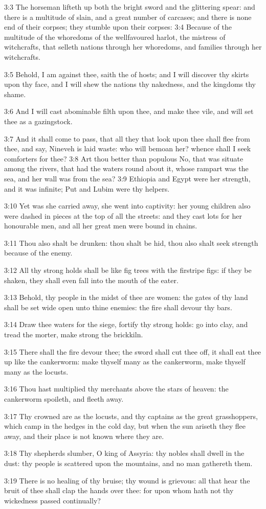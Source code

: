3:3 The horseman lifteth up both the bright sword and the glittering spear: and there is a multitude of slain, and a great number of carcases; and there is none end of their corpses; they stumble upon their corpses: 3:4 Because of the multitude of the whoredoms of the wellfavoured harlot, the mistress of witchcrafts, that selleth nations through her whoredoms, and families through her witchcrafts.

3:5 Behold, I am against thee, saith the \LORD of hosts; and I will discover thy skirts upon thy face, and I will shew the nations thy nakedness, and the kingdoms thy shame.

3:6 And I will cast abominable filth upon thee, and make thee vile, and will set thee as a gazingstock.

3:7 And it shall come to pass, that all they that look upon thee shall flee from thee, and say, Nineveh is laid waste: who will bemoan her?  whence shall I seek comforters for thee?  3:8 Art thou better than populous No, that was situate among the rivers, that had the waters round about it, whose rampart was the sea, and her wall was from the sea?  3:9 Ethiopia and Egypt were her strength, and it was infinite; Put and Lubim were thy helpers.

3:10 Yet was she carried away, she went into captivity: her young children also were dashed in pieces at the top of all the streets: and they cast lots for her honourable men, and all her great men were bound in chains.

3:11 Thou also shalt be drunken: thou shalt be hid, thou also shalt seek strength because of the enemy.

3:12 All thy strong holds shall be like fig trees with the firstripe figs: if they be shaken, they shall even fall into the mouth of the eater.

3:13 Behold, thy people in the midst of thee are women: the gates of thy land shall be set wide open unto thine enemies: the fire shall devour thy bars.

3:14 Draw thee waters for the siege, fortify thy strong holds: go into clay, and tread the morter, make strong the brickkiln.

3:15 There shall the fire devour thee; the sword shall cut thee off, it shall eat thee up like the cankerworm: make thyself many as the cankerworm, make thyself many as the locusts.

3:16 Thou hast multiplied thy merchants above the stars of heaven: the cankerworm spoileth, and fleeth away.

3:17 Thy crowned are as the locusts, and thy captains as the great grasshoppers, which camp in the hedges in the cold day, but when the sun ariseth they flee away, and their place is not known where they are.

3:18 Thy shepherds slumber, O king of Assyria: thy nobles shall dwell in the dust: thy people is scattered upon the mountains, and no man gathereth them.

3:19 There is no healing of thy bruise; thy wound is grievous: all that hear the bruit of thee shall clap the hands over thee: for upon whom hath not thy wickedness passed continually?

